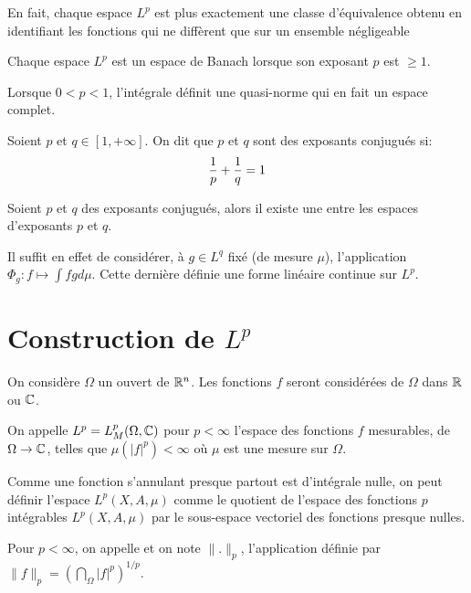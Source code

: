 \medskip
En fait, chaque espace $L^p$ est plus exactement une classe d'équivalence obtenu en
identifiant les fonctions qui ne diffèrent que sur un ensemble négligeable

\medskip
Chaque espace $L^p$ est un espace de Banach lorsque son exposant $p$ est $\ge 1$.

\medskip
Lorsque $0 < p < 1$, l'intégrale définit une quasi-norme qui en fait un espace complet.

\medskip
\begin{definition}
Soient $p$ et $q\in [1,+\infty]$. On dit que $p$ et $q$ sont des exposants conjugués si:
\begin{equation}\colorred\dfrac1p + \dfrac1q = 1 \end{equation}
\end{definition}

\begin{theoreme}
Soient $p$ et $q$ des exposants conjugués, alors il existe une  entre les espaces d'exposants $p$ et $q$.
\end{theoreme}
Il suffit en effet de considérer, à $g\in L^q$ fixé (de mesure $\mu$), l'application $\Phi_g: f\mapsto \int fgd\mu$. Cette dernière
définie une forme linéaire continue sur $L^p$.

\medskip
\section{Construction de $L^p$}

On considère $\Omega$ un ouvert de $\mathbb R^n$.
Les fonctions $f$ seront considérées de $\Omega$  dans $\mathbb R$ ou $\mathbb C$.

\medskip
On appelle $\colorblue L^p \colorblack= L^p_M(\Omega,\CC)$ pour $p<\infty$
l'espace des fonctions $f$ mesurables, de $\Omega \rightarrow \mathbb C$, telles que
$\mu(|f|^p)<\infty$ où $\mu$ est une mesure sur $\Omega$.

\medskip
Comme une fonction s'annulant presque partout est d'intégrale nulle, on peut définir
l'espace $L^p(X,A,\mu)$ comme le quotient de l'espace des fonctions $p$ intégrables
$L^p(X,A,\mu)$ par le sous-espace vectoriel des fonctions presque nulles.


\medskip
\begin{definition}[Norme $L^p$]
Pour $p<\infty$, on appelle  et on note $\|.\|_p$,
l'application définie par $\|f\|_p=\left(\dint_\Omega |f|^p\right)^{1/p}$.
\end{definition}

